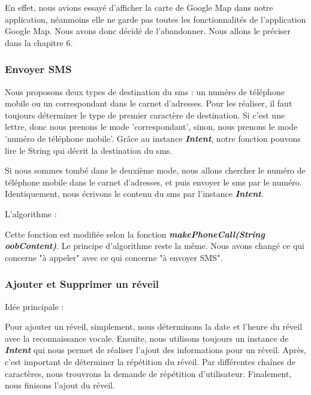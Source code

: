 \indent En effet, nous avions essayé d'afficher la carte de Google Map dans notre application, néanmoins elle ne garde pas toutes les fonctionnalités de l'application Google Map. Nous avons donc décidé de l'abandonner. Nous allons le préciser dans la chapitre 6.

\subsubsection{Envoyer SMS}

\indent Nous proposons deux types de destination du sms : un numéro de téléphone mobile ou un correspondant dans le carnet d'adresses.  Pour les réaliser, il faut toujours déterminer le type de premier caractère de destination. Si c'est une lettre, donc nous prenons le mode 'correspondant', sinon, nous prenons le mode 'numéro de téléphone mobile'. Grâce au instance \textbf{\emph{Intent}}, notre fonction pouvons lire le String qui décrit la destination du sms. 

\indent Si nous sommes tombé dans le deuxième mode, nous allons chercher le numéro de téléphone mobile dans le carnet d'adresses, et puis envoyer le sms par le numéro.\\

\indent Identiquement, nous écrivons le contenu du sms par l'instance \textbf{\emph{Intent}}.

\indent L'algorithme :


	Cette fonction est modifiée selon la fonction \textbf{\emph{makePhoneCall(String oobContent)}}. Le principe d'algorithme reste la même. Nous avons changé ce qui concerne "à appeler" avec ce qui concerne "à envoyer SMS".
	
\subsubsection{Ajouter et Supprimer un réveil}

\indent Idée principale :

\indent Pour ajouter un réveil, simplement, nous déterminons la date et l'heure du réveil avec la reconnaissance vocale. Ensuite, nous utilisons toujours un instance de \textbf{\emph{Intent}} qui nous permet de réaliser l'ajout des informations pour un réveil. Après, c'est important de déterminer la répétition du réveil. Par différentes chaînes de caractères, nous trouvrons la demande de répétition d'utilisateur. Finalement, nous finisons l'ajout du réveil.

